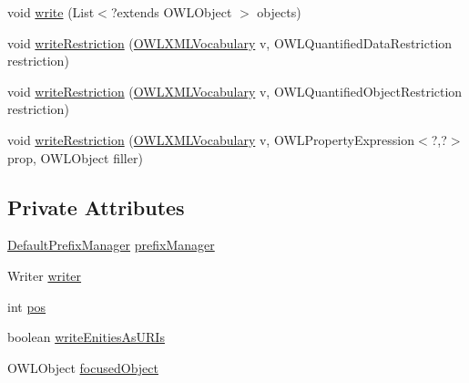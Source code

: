 \begin{DoxyCompactItemize}
void \hyperlink{classorg_1_1coode_1_1owlapi_1_1functionalrenderer_1_1_o_w_l_object_renderer_a2cf2592f946546de2d9d7918f5b87d4f}{write} (List$<$?extends O\-W\-L\-Object $>$ objects)
\item 
void \hyperlink{classorg_1_1coode_1_1owlapi_1_1functionalrenderer_1_1_o_w_l_object_renderer_ad763d00e8a0e1ae1d9687e55d4bbd820}{write\-Restriction} (\hyperlink{enumorg_1_1semanticweb_1_1owlapi_1_1vocab_1_1_o_w_l_x_m_l_vocabulary}{O\-W\-L\-X\-M\-L\-Vocabulary} v, O\-W\-L\-Quantified\-Data\-Restriction restriction)
\item 
void \hyperlink{classorg_1_1coode_1_1owlapi_1_1functionalrenderer_1_1_o_w_l_object_renderer_add453e7f2ffd7878f6065c2d82473beb}{write\-Restriction} (\hyperlink{enumorg_1_1semanticweb_1_1owlapi_1_1vocab_1_1_o_w_l_x_m_l_vocabulary}{O\-W\-L\-X\-M\-L\-Vocabulary} v, O\-W\-L\-Quantified\-Object\-Restriction restriction)
\item 
void \hyperlink{classorg_1_1coode_1_1owlapi_1_1functionalrenderer_1_1_o_w_l_object_renderer_ad83802b6ad22ebddef2a6b2fd501d481}{write\-Restriction} (\hyperlink{enumorg_1_1semanticweb_1_1owlapi_1_1vocab_1_1_o_w_l_x_m_l_vocabulary}{O\-W\-L\-X\-M\-L\-Vocabulary} v, O\-W\-L\-Property\-Expression$<$?,?$>$ prop, O\-W\-L\-Object filler)
\end{DoxyCompactItemize}
\subsection*{Private Attributes}
\begin{DoxyCompactItemize}
\item 
\hyperlink{classorg_1_1semanticweb_1_1owlapi_1_1util_1_1_default_prefix_manager}{Default\-Prefix\-Manager} \hyperlink{classorg_1_1coode_1_1owlapi_1_1functionalrenderer_1_1_o_w_l_object_renderer_aa04acf8b7465c15340e459e871cfef6d}{prefix\-Manager}
\item 
Writer \hyperlink{classorg_1_1coode_1_1owlapi_1_1functionalrenderer_1_1_o_w_l_object_renderer_a495157ee4d33edb42fa323358d8fcceb}{writer}
\item 
int \hyperlink{classorg_1_1coode_1_1owlapi_1_1functionalrenderer_1_1_o_w_l_object_renderer_a6b8e1eb34565f45d3eac50bf41515dd3}{pos}
\item 
boolean \hyperlink{classorg_1_1coode_1_1owlapi_1_1functionalrenderer_1_1_o_w_l_object_renderer_a51dd94042580b6450f6d31f6af99d261}{write\-Enities\-As\-U\-R\-Is}
\item 
O\-W\-L\-Object \hyperlink{classorg_1_1coode_1_1owlapi_1_1functionalrenderer_1_1_o_w_l_object_renderer_aab7d3d8914e344953df950891a85df5a}{focused\-Object}
\end{DoxyCompactItemize}


